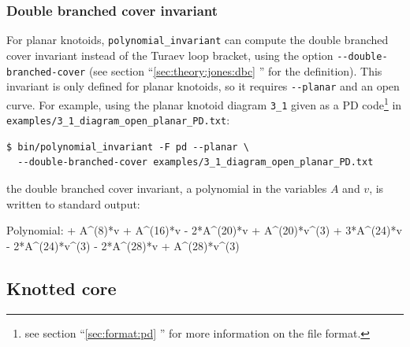 \subsubsection{Double branched cover invariant}
For planar knotoids, \lstinline{polynomial_invariant} can compute the double branched cover invariant instead of the Turaev loop bracket, using the option \lstinline{--double-branched-cover} (see section ``\ref{sec:theory:jones:dbc} '' for the definition). This invariant is only defined for planar knotoids, so it requires \lstinline{--planar} and an open curve. For example, using the planar knotoid diagram \lstinline{3_1} given as a PD code\footnote{see section ``\ref{sec:format:pd} '' for more information on the file format.} in \lstinline{examples/3_1_diagram_open_planar_PD.txt}:
\begin{lstlisting}
$ bin/polynomial_invariant -F pd --planar \
  --double-branched-cover examples/3_1_diagram_open_planar_PD.txt
\end{lstlisting}
the double branched cover invariant, a polynomial in the variables $A$ and $v$, is written to standard output:
\begin{lstlistingsmall}
Polynomial:  + A^(8)*v + A^(16)*v - 2*A^(20)*v + A^(20)*v^(3) + 3*A^(24)*v - 2*A^(24)*v^(3) - 2*A^(28)*v + A^(28)*v^(3)
\end{lstlistingsmall}

\subsection{Knotted core}
